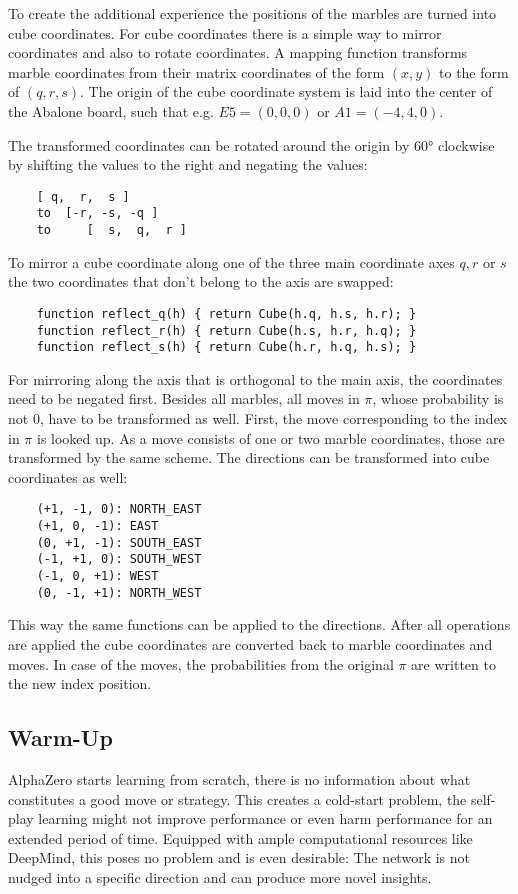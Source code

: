 To create the additional experience the positions of the marbles are turned into cube coordinates. For cube coordinates there is a simple way to mirror coordinates and also to rotate coordinates. A mapping function transforms marble coordinates from their matrix coordinates of the form $(x, y)$ to the form of $(q, r, s)$. The origin of the cube coordinate system is laid into the center of the Abalone board, such that e.g. $E5 = (0, 0, 0)$ or $A1 = (-4, 4, 0)$.

The transformed coordinates can be rotated around the origin by 60° clockwise by shifting the values to the right and negating the values:

\begin{BVerbatim}
    [ q,  r,  s ]
    to  [-r, -s, -q ]
    to     [  s,  q,  r ]
\end{BVerbatim}

To mirror a cube coordinate along one of the three main coordinate axes $q, r$ or $s$ the two coordinates that don't belong to the axis are swapped:

\begin{BVerbatim}
    function reflect_q(h) { return Cube(h.q, h.s, h.r); }
    function reflect_r(h) { return Cube(h.s, h.r, h.q); }
    function reflect_s(h) { return Cube(h.r, h.q, h.s); }
\end{BVerbatim}

For mirroring along the axis that is orthogonal to the main axis, the coordinates need to be negated first. Besides all marbles, all moves in $\pi$, whose probability is not $0$, have to be transformed as well. First, the move corresponding to the index in $\pi$ is looked up. As a move consists of one or two marble coordinates, those are transformed by the same scheme. The directions can be transformed into cube coordinates as well:

\begin{BVerbatim}
    (+1, -1, 0): NORTH_EAST
    (+1, 0, -1): EAST
    (0, +1, -1): SOUTH_EAST
    (-1, +1, 0): SOUTH_WEST
    (-1, 0, +1): WEST
    (0, -1, +1): NORTH_WEST
\end{BVerbatim}

This way the same functions can be applied to the directions. After all operations are applied the cube coordinates are converted back to marble coordinates and moves. In case of the moves, the probabilities from the original $\pi$ are written to the new index position.

\subsection{Warm-Up}
AlphaZero starts learning from scratch, there is no information about what constitutes a good move or strategy. This creates a cold-start problem, the self-play learning might not improve performance or even harm performance for an extended period of time. Equipped with ample computational resources like DeepMind, this poses no problem and is even desirable: The network is not nudged into a specific direction and can produce more novel insights.


